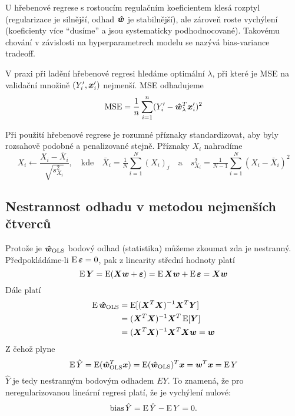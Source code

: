U hřebenové regrese s rostoucím regulačním koeficientem klesá rozptyl (regularizace je silnější, odhad $\bm{\hat{w}}$ je stabilnější), ale zároveň roste vychýlení (koeficienty více ``dusíme'' a jsou systematicky podhodnocované). Takovému chování v závislosti na hyperparametrech modelu se nazývá bias-variance tradeoff.

V praxi při ladění hřebenové regresi hledáme optimální $\lambda$, při které je MSE na validační množině $(Y'_i, \bm{x}'_i)$ nejmenší. MSE odhadujeme
\[\operatorname{MSE} = \frac{1}{n} \sum_{i=1}^{n} (Y'_i - \bm{\hat{w}}_\lambda^T\bm{x}'_i)^2\]

Při použití hřebenové regrese je rozumné příznaky standardizovat, aby byly rozsahově podobné a penalizované stejně. Příznaky $X_i$ nahradíme
\[
    X_i \leftarrow \frac{X_i - \bar{X}_i}{\sqrt{s_{X_i}^2}},
    \quad \text{kde} \quad
    \bar{X}_i = \tfrac{1}{N} \sum_{i=1}^{N} (X_i)_j
    \quad \text{a} \quad
    s_{X_i}^2 = \tfrac{1}{N-1} \sum_{i=1}^{N} (X_i - \bar{X}_i)^2
\]

\subsection{Nestrannost odhadu v metodou nejmenších čtverců}

Protože je $\bm{\hat{w}}_{\text{OLS}}$ bodový odhad (statistika) můžeme zkoumat zda je nestranný. Předpokládáme-li $\operatorname{E} \bm{\varepsilon} = 0$, pak z linearity střední hodnoty platí
\[
    \operatorname{E} \bm{Y} = \operatorname{E}(\bm{X}\bm{w} + \bm{\varepsilon})
    = \operatorname{E}\bm{X}\bm{w} + \operatorname{E}\bm{\varepsilon}
    = \bm{X}\bm{w}
\]
Dále platí
\begin{align*}
    \operatorname{E}\bm{\hat{w}}_{\text{OLS}}
     & = \operatorname{E}[(\bm{X}^T\bm{X})^{-1}\bm{X}^T\bm{Y}]      \\
     & = (\bm{X}^T\bm{X})^{-1}\bm{X}^T\operatorname{E}[\bm{Y}]      \\
     & = (\bm{X}^T\bm{X})^{-1}\bm{X}^T\bm{X}\bm{w} = \bm{w}
\end{align*}
Z čehož plyne
\[
    \operatorname{E} \hat{Y} = \operatorname{E}(\bm{\hat{w}}_{\text{OLS}}^T\bm{x}) = \operatorname{E}(\bm{\hat{w}}_{\text{OLS}})^T\bm{x} = \bm{w}^T\bm{x} = \operatorname{E} Y
\]
$\hat{Y}$ je tedy nestranným bodovým odhadem $EY$. To znamená, že pro neregularizovanou lineární regresi platí, že je vychýlení nulové:
\[\text{bias}\,\hat{Y} = \operatorname{E}\hat{Y} - \operatorname{E} Y = 0.\]
